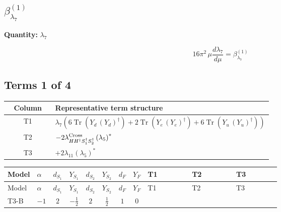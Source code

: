 \documentclass[8pt]{article}
\begin{document}
\begin{landscape}
\section*{$\beta_{\lambda_{7}}^{(1)}$}
\noindent\textbf{Quantity: }$\lambda_{7}$\par\smallskip
\[16\pi^2\,\mu\frac{d \lambda_{7}}{d\mu}=\beta_{\lambda_{7}}^{(1)}\]
\subsection*{Terms 1 of 4}
\begin{center}
\begin{tabular}{@{}c >{\raggedright\arraybackslash}p{0.82\linewidth}@{}}
\toprule
Column & Representative term structure \\
\midrule
T1 & \(\displaystyle {\lambda_7} (6 \operatorname{Tr}\!\left({Y_d}\,\left({Y_d}\right)^{\dagger}\right)+2 \operatorname{Tr}\!\left({Y_e}\,\left({Y_e}\right)^{\dagger}\right)+6 \operatorname{Tr}\!\left({Y_u}\,\left({Y_u}\right)^{\dagger}\right))\) \\
\midrule
T2 & \(\displaystyle -2 {\lambda_{H H^\dagger S_1^\dagger S_2^\dagger}^{\rm Cross}} \left({\lambda_5}\right)^{*}\) \\
\midrule
T3 & \(\displaystyle +2 {\lambda_{11}} \left({\lambda_5}\right)^{*}\) \\
\midrule
\bottomrule
\end{tabular}
\end{center}
\smallskip
\tiny
\begin{longtable}{@{}llcccccc >{\raggedright\arraybackslash}p{0.21\linewidth} >{\raggedright\arraybackslash}p{0.21\linewidth} >{\raggedright\arraybackslash}p{0.21\linewidth}@{}}
\toprule
Model & $\alpha$ & $d_{S_1}$ & $Y_{S_1}$ & $d_{S_2}$ & $Y_{S_2}$ & $d_F$ & $Y_F$ & T1 & T2 & T3 \\
\midrule
\endfirsthead
\toprule
Model & $\alpha$ & $d_{S_1}$ & $Y_{S_1}$ & $d_{S_2}$ & $Y_{S_2}$ & $d_F$ & $Y_F$ & T1 & T2 & T3 \\
\midrule
\endhead
T3-B & $-1$ & $2$ & $-\frac{1}{2}$ & $2$ & $\frac{1}{2}$ & $1$ & $0$ & \scriptsize\adjustbox{max width=\linewidth}{$\begin{gathered} {\lambda_7} (6 \operatorname{Tr}\!\left({Y_d}\,\left({Y_d}\right)^{\dagger}\right)+2 \operatorname{Tr}\!\left({Y_e}\,\left({Y_e}\right)^{\dagger}\right)+6 \operatorname{Tr}\!\left({Y_u}\,\left({Y_u}\right)^{\dagger}\right))\end{gathered}$} & \scriptsize\adjustbox{max width=\linewidth}{$\begin{gathered} -2 {\lambda_{H H^\dagger S_1^\dagger S_2^\dagger}^{\rm Cross}} \left({\lambda_5}\right)^{*}\end{gathered}$} & \scriptsize\adjustbox{max width=\linewidth}{$\begin{gathered} +2 {\lambda_{11}} \left({\lambda_5}\right)^{*}\end{gathered}$} \\

\end{longtable}
\end{landscape}
\end{document}
